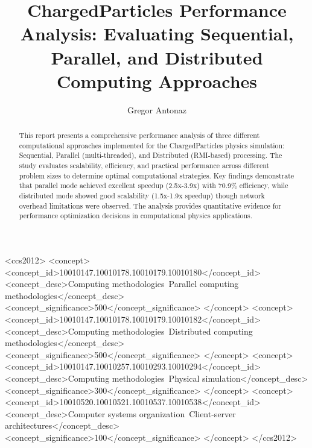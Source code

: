 \documentclass[sigconf]{acmart}
\begin{document}
\title[ChargedParticles Performance Analysis]{ChargedParticles Performance Analysis: Evaluating Sequential, Parallel, and Distributed Computing Approaches}

\author{Gregor Antonaz}

\begin{abstract}
This report presents a comprehensive performance analysis of three different computational approaches implemented for the ChargedParticles physics simulation: Sequential, Parallel (multi-threaded), and Distributed (RMI-based) processing. The study evaluates scalability, efficiency, and practical performance across different problem sizes to determine optimal computational strategies. Key findings demonstrate that parallel mode achieved excellent speedup (2.5x-3.9x) with 70.9\% efficiency, while distributed mode showed good scalability (1.5x-1.9x speedup) though network overhead limitations were observed. The analysis provides quantitative evidence for performance optimization decisions in computational physics applications.
\end{abstract}

\begin{CCSXML}
<ccs2012>
<concept>
<concept_id>10010147.10010178.10010179.10010180</concept_id>
<concept_desc>Computing methodologies~Parallel computing methodologies</concept_desc>
<concept_significance>500</concept_significance>
</concept>
<concept>
<concept_id>10010147.10010178.10010179.10010182</concept_id>
<concept_desc>Computing methodologies~Distributed computing methodologies</concept_desc>
<concept_significance>500</concept_significance>
</concept>
<concept>
<concept_id>10010147.10010257.10010293.10010294</concept_id>
<concept_desc>Computing methodologies~Physical simulation</concept_desc>
<concept_significance>300</concept_significance>
</concept>
<concept>
<concept_id>10010520.10010521.10010537.10010538</concept_id>
<concept_desc>Computer systems organization~Client-server architectures</concept_desc>
<concept_significance>100</concept_significance>
</concept>
</ccs2012>
\end{CCSXML}
\end{document}
